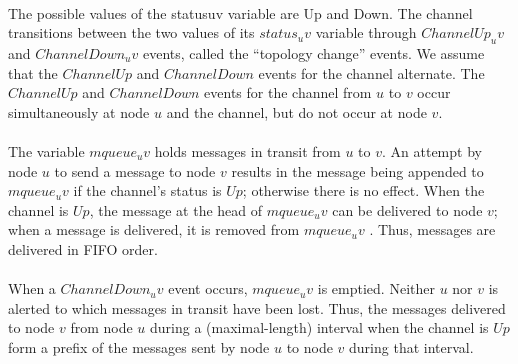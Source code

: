 \paragraph{}The possible values of the statusuv variable are Up and Down. The channel transitions between the two values of its $status_uv$ variable through $ChannelUp_uv$ and $ChannelDown_uv$ events, called the “topology change” events. We assume that the $ChannelUp$ and $ChannelDown$ events for the channel alternate. The $ChannelUp$ and $ChannelDown$ events for the channel from $u$ to $v$ occur simultaneously at node $u$ and the channel, but do not occur at node $v$.
\paragraph{}The variable $mqueue_uv$ holds messages in transit from $u$ to $v$. An attempt by node $u$ to send a message to node $v$ results in the message being appended to $mqueue_uv$ if the channel’s status is $Up$; otherwise there is no effect. When the channel is $Up$, the message at the head of $mqueue_uv$ can be delivered to node $v$; when a message is delivered, it is removed from $mqueue_uv$ . Thus, messages are delivered in FIFO order.
\paragraph{}When a $ChannelDown_uv$ event occurs, $mqueue_uv$ is emptied. Neither $u$ nor $v$ is alerted to which messages in transit have been lost. Thus, the messages delivered to node $v$ from node $u$ during a (maximal-length) interval when the channel is $Up$ form a prefix of the messages sent by node $u$ to node $v$ during that interval.

